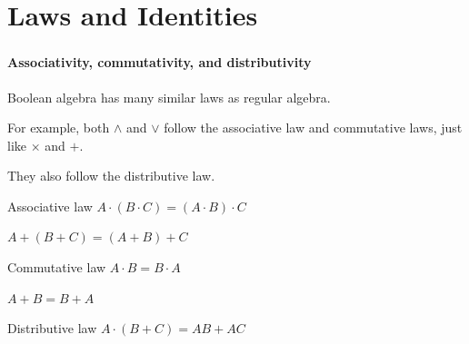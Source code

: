 \documentclass[mathserif]{beamer}
\newenvironment{namedframe}[1]%
	{\begin{frame}\frametitle{\secname}\framesubtitle{#1}}
	{\end{frame}}
\begin{document}
	\section{Laws and Identities}
	\begin{namedframe}{Associativity, commutativity, and distributivity}
		Boolean algebra has many similar laws as regular algebra.

		For example, both $\wedge$ and $\vee$ follow the associative law and commutative laws, just like $\times$ and $+$.

		They also follow the distributive law.
		\begin{center}
			\pause
			\begin{minipage}{0.45\textwidth}
				\begin{block}{Associative law}
					\centering
					$A \cdot (B \cdot C) = (A \cdot B) \cdot C$

					$A + (B + C) = (A + B) + C$
				\end{block}
			\end{minipage}
			\pause
			\begin{minipage}{0.45\textwidth}
				\begin{block}{Commutative law}
					\centering
					$A \cdot B = B \cdot A$

					$A + B = B + A$
				\end{block}
			\end{minipage}
		\end{center}
		\pause
		\begin{block}{Distributive law}
			\centering
			$A \cdot (B + C) = AB + AC$
		\end{block}
	\end{namedframe}
\end{document}

